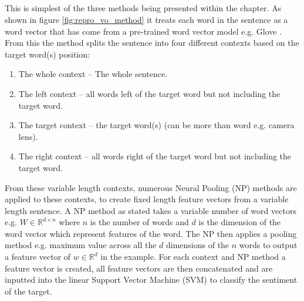 \subsection{\cite{repro_vo_2015}}
This is simplest of the three methods being presented within the chapter. As shown in figure \ref{fig:repro_vo_method} it treats each word in the sentence as a word vector that has come from a pre-trained word vector model e.g. Glove \citep{repro_pennington_2014}. From this the method splits the sentence into four different contexts based on the target word(s) position:
\begin{enumerate}
    \item The whole context -- The whole sentence.
    \item The left context -- all words left of the target word but not including the target word.
    \item The target context -- the target word(s) (can be more than word e.g. camera lens).
    \item The right context -- all words right of the target word but not including the target word.
\end{enumerate}
From these variable length contexts, numerous Neural Pooling (NP) methods are applied to these contexts, to create fixed length feature vectors from a variable length sentence. A NP method as stated takes a variable number of word vectors e.g. $W \in  \mathbb{R}^{d\times n}$ where $n$ is the number of words and $d$ is the dimension of the word vector which represent features of the word. The NP then applies a pooling method e.g. maximum value across all the $d$ dimensions of the $n$ words to output a feature vector of $w \in \mathbb{R}^{d}$ in the example. For each context and NP method a feature vector is created, all feature vectors are then concatenated and are inputted into the linear Support Vector Machine (SVM) to classify the sentiment of the target.\\
\\

